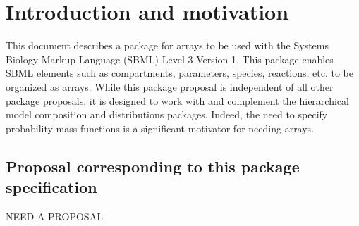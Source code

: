 
\section{Introduction and motivation}
\label{intro}

This document describes a package for arrays to be used with the Systems Biology Markup Language (SBML) Level 3 Version 1.  This package enables SBML elements such as compartments, parameters, species, reactions, etc. to be organized as arrays.  While this package proposal is independent of all other package proposals, it is designed to work with and complement the hierarchical model composition and distributions packages.  Indeed, the need to specify probability mass functions is a significant motivator for needing arrays.

\subsection{Proposal corresponding to this package specification}

NEED A PROPOSAL




